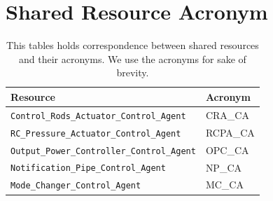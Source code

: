 \documentclass[10pt,a4paper]{report}
\begin{document}
\section{Shared Resource Acronym}
\begin{table}[h!tb]
\centering
\begin{tabular}{|l | l|}
\hline
\textbf{Resource} & \textbf{Acronym} \\
\hline
\texttt{Control\_Rods\_Actuator\_Control\_Agent}   & CRA\_CA  \\
\texttt{RC\_Pressure\_Actuator\_Control\_Agent}    & RCPA\_CA \\
\texttt{Output\_Power\_Controller\_Control\_Agent} & OPC\_CA  \\
\texttt{Notification\_Pipe\_Control\_Agent}        & NP\_CA   \\
\texttt{Mode\_Changer\_Control\_Agent}             & MC\_CA   \\
\hline
\end{tabular}
\caption{
    This tables holds correspondence between shared resources and their acronyms.
    We use the acronyms for sake of brevity. 
}
\label{resacronym}
\end{table}
\end{document}
